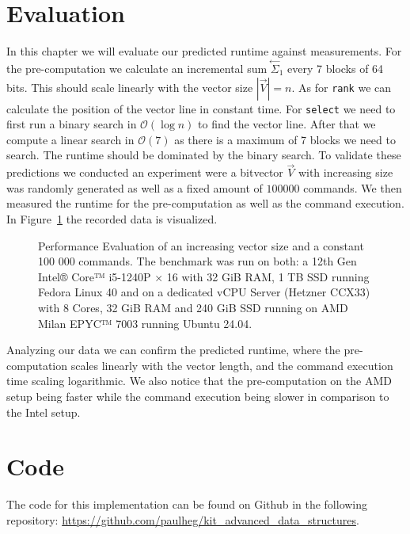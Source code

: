 \documentclass[a4paper,UKenglish,cleveref, autoref, thm-restate]{lipics-v2021}
\def\code#1{\texttt{#1}}
\newcommand\prevsum[0]{\ensuremath{\overset{\leftarrow}{\Sigma}_1}}
\begin{document}
\section{Evaluation}
In this chapter we will evaluate our predicted runtime against measurements.
For the pre-computation we calculate an incremental sum $\prevsum$ every 7 blocks of 64 bits.
This should scale linearly with the vector size $|\vec{V}|=n$.
As for \code{rank} we can calculate the position of the vector line in constant time.
For \code{select} we need to first run a binary search in $\mathcal{O}(\log{n})$ to find the vector line.
After that we compute a linear search in $\mathcal{O}(7)$ as there is a maximum of 7 blocks we need to search.
The runtime should be dominated by the binary search.
To validate these predictions we conducted an experiment were a bitvector $\vec{V}$ with increasing
size was randomly generated as well as a fixed amount of $100 000$ commands.
We then measured the runtime for the pre-computation as well as the command execution.
In Figure~\ref{fig:performance_eval} the recorded data is visualized.
\begin{figure}[t]
    \centering
    
    \caption{%
        Performance Evaluation of an increasing vector size and a constant 100 000 commands.
        The benchmark was run on both:
        a 12th Gen Intel® Core™ i5-1240P × 16 with 32 GiB RAM, 1 TB SSD running Fedora Linux 40
        and on a dedicated vCPU Server (Hetzner CCX33) with 
        8 Cores, 32 GiB RAM and 240 GiB SSD running on AMD Milan EPYC™ 7003 running Ubuntu 24.04.
    }
    \label{fig:performance_eval}
\end{figure}
Analyzing our data we can confirm the predicted runtime, where the pre-computation scales linearly
with the vector length, and the command execution time scaling logarithmic.
We also notice that the pre-computation on the AMD setup being faster while the command execution being
slower in comparison to the Intel setup.



% 

\appendix

\section{Code}
The code for this implementation can be found on Github in the following repository: 
\url{https://github.com/paulheg/kit_advanced_data_structures}.
\end{document}
